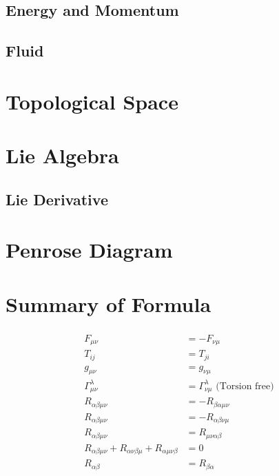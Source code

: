 \documentclass[12pt]{article}
\theoremstyle{mystyle}{\newtheorem{definition}{Definition}[section]}
\theoremstyle{mystyle}{\newtheorem{theorem}[definition]{Theorem}}
\theoremstyle{mystyle}{\newtheorem*{remark}{Remark}}
\theoremstyle{mystyle}{\newtheorem*{example}{Example}}
\theoremstyle{mystyle}{\newtheorem*{examples}{Examples}}
\theoremstyle{cstyle}{\newtheorem*{cthm}{}}
\begin{document}
\subsection{Energy and Momentum}
\subsection{Fluid}


\section{Topological Space}

\section{Lie Algebra}

\subsection{Lie Derivative}

\section{Penrose Diagram}
\section{Summary of Formula}
\begin{align*}
  \begin{split}
    F_{\mu\nu} &= - F_{\nu\mu}\\
    T_{ij} &= T_{ji}\\
    g_{\mu\nu} &= g_{\nu\mu}\\
    \Gamma ^{\lambda}_{\mu\nu} &= \Gamma^{\lambda}_{\nu\mu} \text{ (Torsion free)}\\
    R_{\alpha\beta\mu\nu} &= -R_{\beta\alpha\mu\nu}\\
    R_{\alpha\beta\mu\nu} &= -R_{\alpha\beta\nu\mu}\\
    R_{\alpha\beta\mu\nu} &= R_{\mu\nu\alpha\beta}\\
    R_{\alpha\beta\mu\nu} + R_{\alpha\nu\beta\mu} + R_{\alpha\mu\nu\beta} &= 0 \\
    R_{\alpha\beta} &= R_{\beta\alpha}
  \end{split}
\end{align*}
\end{document}
